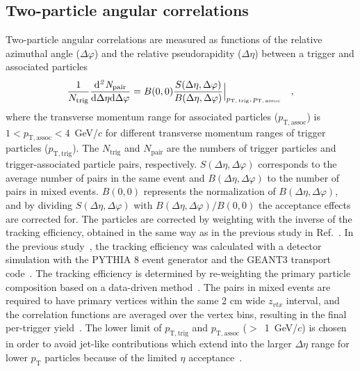\subsection{Two-particle angular correlations}
Two-particle angular correlations are measured as functions of the relative azimuthal angle ($\Delta\varphi$) and the relative pseudorapidity ($\Delta\eta$) between a trigger and associated particles
\begin{eqnarray}
\frac{1}{N_{\rm{trig}}} \frac{ \rm{d}\it{}^{2} N_{\rm{pair}} }{ \rm{d} \Delta\eta \rm{d}\Delta\varphi} = B(0, 0)\frac{S(\Delta\eta, \Delta\varphi)}{B(\Delta\eta, \Delta\varphi)}  \Big\lvert_{p_\mathrm{T,\,trig},\,p_\mathrm{T,\,assoc}}\quad , 
\label{eq:corrfunction}
\end{eqnarray}
where the transverse momentum range for associated particles ($p_\mathrm{T,assoc}$) is $1<p_\mathrm{T,assoc}<4$~GeV/$c$ for different transverse momentum ranges of trigger particles ($p_\mathrm{T,trig}$).
The $N_\mathrm{trig}$ and $N_\mathrm{pair}$ are the numbers of trigger particles and trigger-associated particle pairs, respectively. $S(\Delta\eta, \Delta\varphi)$ corresponds to the average number of pairs in the same event and $B(\Delta\eta, \Delta\varphi)$ to the number of pairs in mixed events. 
$B (0,0)$ represents the normalization of $B(\Delta\eta, \Delta\varphi)$, and by dividing $S(\Delta\eta, \Delta\varphi)$ with $B(\Delta\eta, \Delta\varphi)/B (0,0)$ the acceptance effects are corrected for. The particles are corrected by weighting with the inverse of the tracking efficiency, obtained in the same way as in the previous study in Ref.~\cite{ALICE:2021nir}.
In the previous study~\cite{ALICE:2021nir}, the tracking efficiency was calculated with a detector simulation with the PYTHIA 8 event generator and the GEANT3 transport code~\cite{Brun:1994aa}. The tracking efficiency is determined by re-weighting the primary particle composition based on a data-driven method~\cite{ALICE:2018hza,ALICE:2018vuu}. 
The pairs in mixed events are required to have primary vertices within the same 2 cm wide $z_{vtx}$ interval, and the correlation functions are averaged over the vertex bins, resulting in the final per-trigger yield~\cite{KOPYLOV1974472:evtmixing,Adam:2016tsv}. The lower limit of $p_\mathrm{T,trig}$ and $p_\mathrm{T,assoc}$ ($>$~1~GeV/$c$) is chosen in order to avoid jet-like contributions which extend into the larger $\Delta\eta$ range for lower $p_\mathrm{T}$ particles because of the limited $\eta$ acceptance~\cite{ALICE:2021nir}. 

